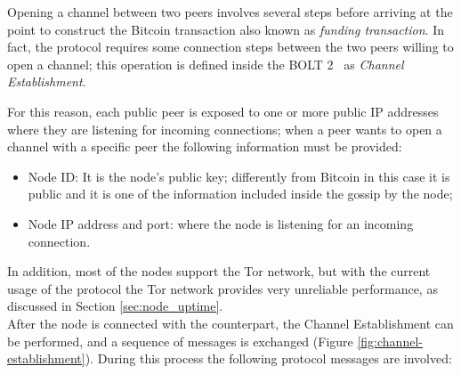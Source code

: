 Opening a channel between two peers involves several steps before arriving at the point to construct the Bitcoin transaction also
known as \emph{funding transaction}.
In fact, the {\LN} protocol requires some connection steps between the two peers willing to open a channel; this
operation is defined inside the BOLT 2~\cite{bolt2} as \emph{Channel Establishment}.

For this reason, each public peer is exposed to one or more public IP addresses where
they are listening for incoming connections; when a peer wants to open
a channel with a specific peer the following information must be provided:

\begin{itemize}
  \item Node ID: It is the node's public key; differently from Bitcoin in this case it is public and it is one of the information included inside the gossip by the node;
  \item Node IP address and port: where the node is listening for an incoming connection.
\end{itemize}

In addition, most of the nodes support the Tor network, but with the current usage of the protocol the Tor network provides very unreliable
performance, as discussed in Section \ref{sec:node_uptime}.\\
After the node is connected with the counterpart, the Channel Establishment can be performed, and a sequence
of messages is exchanged (Figure \ref{fig:channel-establishment}). During this process
the following protocol messages are involved:

